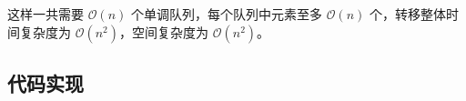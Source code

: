 这样一共需要 \(\mathcal{O}(n)\) 个单调队列，每个队列中元素至多
\(\mathcal{O}(n)\) 个，转移整体时间复杂度为
\(\mathcal{O}(n^2)\)，空间复杂度为 \(\mathcal{O}(n^2)\)。

\subsection{代码实现}

\inputminted[frame=lines, numbers=left, fontsize=\scriptsize, tabsize=4, breaklines=true]{c++}{code/5.cpp}

